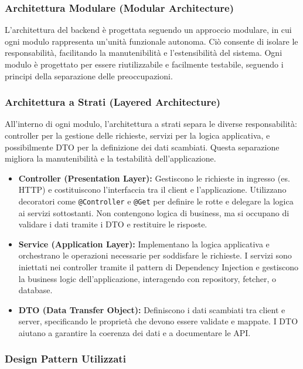 \subsubsection{Architettura Modulare (Modular Architecture)}
L’architettura del backend è progettata seguendo un approccio modulare, in cui ogni modulo rappresenta un'unità funzionale autonoma. Ciò consente di isolare le responsabilità, facilitando la manutenibilità e l'estensibilità del sistema. Ogni modulo è progettato per essere riutilizzabile e facilmente testabile, seguendo i principi della separazione delle preoccupazioni.

\subsubsection{Architettura a Strati (Layered Architecture)}
All'interno di ogni modulo, l'architettura a strati separa le diverse responsabilità: controller per la gestione delle richieste, servizi per la logica applicativa, e possibilmente DTO per la definizione dei dati scambiati. Questa separazione migliora la manutenibilità e la testabilità dell'applicazione.

\begin{itemize}  
  \item \textbf{Controller (Presentation Layer):} Gestiscono le richieste in ingresso (es. HTTP) e costituiscono l'interfaccia tra il client e l'applicazione. Utilizzano decoratori come \texttt{@Controller} e \texttt{@Get} per definire le rotte e delegare la logica ai servizi sottostanti. Non contengono logica di business, ma si occupano di validare i dati tramite i DTO e restituire le risposte.
  
  \item \textbf{Service (Application Layer):} Implementano la logica applicativa e orchestrano le operazioni necessarie per soddisfare le richieste. I servizi sono iniettati nei controller tramite il pattern di Dependency Injection e gestiscono la business logic dell'applicazione, interagendo con repository, fetcher, o database.
  
  \item \textbf{DTO (Data Transfer Object):} Definiscono i dati scambiati tra client e server, specificando le proprietà che devono essere validate e mappate. I DTO aiutano a garantire la coerenza dei dati e a documentare le API.
\end{itemize}

\subsubsection{Design Pattern Utilizzati}

